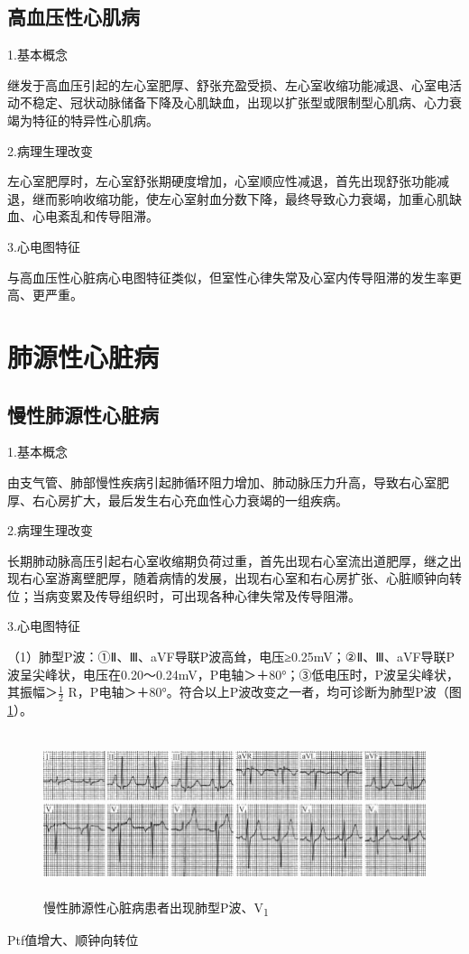 \subsection{高血压性心肌病}

1.基本概念

继发于高血压引起的左心室肥厚、舒张充盈受损、左心室收缩功能减退、心室电活动不稳定、冠状动脉储备下降及心肌缺血，出现以扩张型或限制型心肌病、心力衰竭为特征的特异性心肌病。

2.病理生理改变

左心室肥厚时，左心室舒张期硬度增加，心室顺应性减退，首先出现舒张功能减退，继而影响收缩功能，使左心室射血分数下降，最终导致心力衰竭，加重心肌缺血、心电紊乱和传导阻滞。

3.心电图特征

与高血压性心脏病心电图特征类似，但室性心律失常及心室内传导阻滞的发生率更高、更严重。

\protect\hypertarget{text00050.htmlux5cux23subid596}{}{}

\section{肺源性心脏病}

\protect\hypertarget{text00050.htmlux5cux23subid597}{}{}

\subsection{慢性肺源性心脏病}

1.基本概念

由支气管、肺部慢性疾病引起肺循环阻力增加、肺动脉压力升高，导致右心室肥厚、右心房扩大，最后发生右心充血性心力衰竭的一组疾病。

2.病理生理改变

长期肺动脉高压引起右心室收缩期负荷过重，首先出现右心室流出道肥厚，继之出现右心室游离壁肥厚，随着病情的发展，出现右心室和右心房扩张、心脏顺钟向转位；当病变累及传导组织时，可出现各种心律失常及传导阻滞。

3.心电图特征

（1）肺型P波：①Ⅱ、Ⅲ、aVF导联P波高耸，电压≥0.25mV；②Ⅱ、Ⅲ、aVF导联P波呈尖峰状，电压在0.20～0.24mV，P电轴＞＋80°；③低电压时，P波呈尖峰状，其振幅＞$\frac{1}{2}$
R，P电轴＞＋80°。符合以上P波改变之一者，均可诊断为肺型P波（图\ref{fig42-6}）。

\begin{figure}[!htbp]
 \centering
 \includegraphics[width=5.78125in,height=1.88542in]{./images/Image00697.jpg}
 \captionsetup{justification=centering}
 \caption{慢性肺源性心脏病患者出现肺型P波、V\textsubscript{1}}
 \label{fig42-6}
  \end{figure} 
Ptf值增大、顺钟向转位

